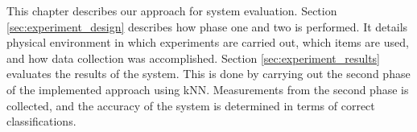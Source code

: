This chapter describes our approach for system evaluation. 
Section \ref{sec:experiment_design} describes how phase one and two is performed.
It details physical environment in which experiments are carried out, which items are used, and how data collection was accomplished.
Section \ref{sec:experiment_results} evaluates the results of the system. 
This is done by carrying out the second phase of the implemented approach using kNN. 
Measurements from the second phase is collected, and the accuracy of the system is determined in terms of correct classifications. 